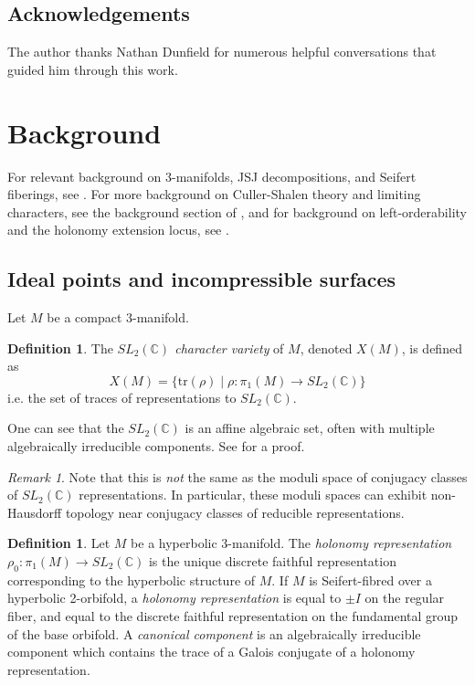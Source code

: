 \documentclass{article}
\theoremstyle{plain}
\theoremstyle{definition}
\newtheorem{definition}[theorem]{Definition}
\theoremstyle{plain}
\theoremstyle{plain}
\theoremstyle{plain}
\theoremstyle{remark}
\newtheorem{remark}[theorem]{Remark}
\theoremstyle{remark}
\theoremstyle{plain}
\theoremstyle{plain}
\begin{document}
\subsection{Acknowledgements}

The author thanks Nathan Dunfield for numerous helpful conversations that guided him through this work. 

\section{Background}\label{sec:background}

For relevant background on 3-manifolds, JSJ decompositions, and Seifert fiberings, see \cite{thurston}. For more background on Culler-Shalen theory and limiting characters, see the background section of \cite{wang}, and for background on left-orderability and the holonomy extension locus, see \cite{gao}.

\subsection{Ideal points and incompressible surfaces}

Let $M$ be a compact 3-manifold. 

\begin{definition}
The \emph{$SL_2(\mathbb{C})$ character variety} of $M$, denoted $X(M)$, is defined as 
\begin{equation}
	X(M) = \{\text{tr}(\rho) \mid \rho: \pi_1(M) \to SL_2(\mathbb{C})\}
\end{equation}
i.e. the set of traces of representations to $SL_2(\mathbb{C})$.
\end{definition}

One can see that the $SL_2(\mathbb{C})$ is an affine algebraic set, often with multiple algebraically irreducible components. See \cite{cullershalen} for a proof. 

\begin{remark}
Note that this is \emph{not} the same as the moduli space of conjugacy classes of $SL_2(\mathbb{C})$ representations. In particular, these moduli spaces can exhibit non-Hausdorff topology near conjugacy classes of reducible representations. 
\end{remark}

\begin{definition}
Let $M$ be a hyperbolic 3-manifold. The \emph{holonomy representation} $\rho_0: \pi_1(M) \to SL_2(\mathbb{C})$ is the unique discrete faithful representation corresponding to the hyperbolic structure of $M$. If $M$ is Seifert-fibred over a hyperbolic 2-orbifold, a \emph{holonomy representation} is equal to $\pm I$ on the regular fiber, and equal to the discrete faithful representation on the fundamental group of the base orbifold. A \emph{canonical component} is an algebraically irreducible component which contains the trace of a Galois conjugate of a holonomy representation. 
\end{definition}
\end{document}
